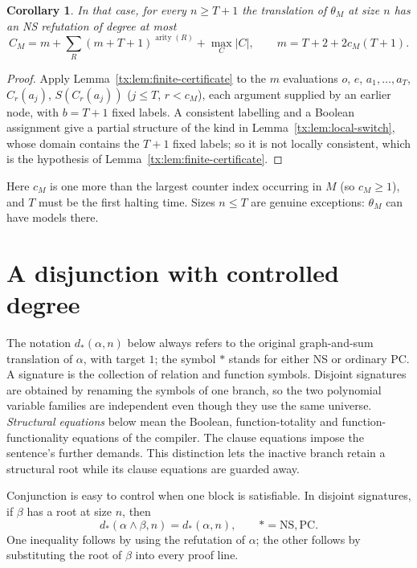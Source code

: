 \documentclass[11pt,a4paper,oneside,openany]{book}
\newtheorem{corollary}[theorem]{Corollary}
\theoremstyle{definition}\newtheorem{definition}[theorem]{Definition}
\theoremstyle{remark}\newtheorem{remark}[theorem]{Remark}
\newcommand{\NS}{\mathrm{NS}}\newcommand{\PC}{\mathrm{PC}}
\numberwithin{equation}{chapter}
\begin{document}
\begin{corollary}\label{tx:cor:switch-degree}
In that case, for every $n\ge T+1$ the translation of $\theta_M$ at size $n$ has an NS refutation
of degree at most
\[
 C_M=m+\sum_R(m+T+1)^{\operatorname{arity}(R)}+\max_{C}|C|,\qquad m=T+2+2c_M(T+1).
\]
\end{corollary}
\begin{proof}
Apply Lemma~\ref{tx:lem:finite-certificate} to the $m$ evaluations $o$, $e$, $a_1,\ldots,a_T$,
$C_r(a_j)$, $S(C_r(a_j))$ ($j\le T$, $r<c_M$), each argument supplied by an earlier node, with
$b=T+1$ fixed labels. A consistent labelling and a Boolean assignment give a partial structure of
the kind in Lemma~\ref{tx:lem:local-switch}, whose domain contains the $T+1$ fixed labels; so it is not
locally consistent, which is the hypothesis of Lemma~\ref{tx:lem:finite-certificate}.
\end{proof}

Here $c_M$ is one more than the largest counter index occurring in $M$ (so $c_M\ge1$), and $T$ must be
the first halting time. Sizes $n\le T$ are genuine exceptions: $\theta_M$ can have models there.

\section{A disjunction with controlled degree}
The notation $d_*(\alpha,n)$ below always refers to the original
graph-and-sum translation of $\alpha$, with target $1$; the symbol $*$
stands for either NS or ordinary PC.
A signature is the collection of relation and function symbols.
Disjoint signatures are obtained by renaming the symbols of one branch,
so the two polynomial variable families are independent even though
they use the same universe. \emph{Structural equations} below mean the
Boolean, function-totality and function-functionality equations of the
compiler. The clause equations impose the sentence's further demands.
This distinction lets the inactive branch retain a structural root
while its clause equations are guarded away.

Conjunction is easy to control when one block is satisfiable. In disjoint
signatures, if $\beta$ has a root at size $n$, then
\begin{equation}\label{tx:eq:satisfiable-block}
 d_*(\alpha\wedge\beta,n)=d_*(\alpha,n),
 \qquad *=\NS,\PC.
\end{equation}
One inequality follows by using the refutation of $\alpha$; the other
follows by substituting the root of $\beta$ into every proof line.
\end{document}
